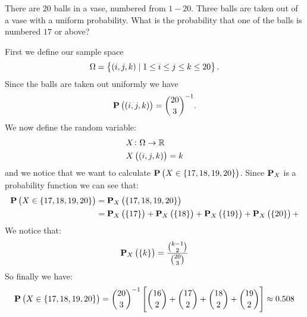 \documentclass[11pt,a4paper]{article}
\begin{document}
  \begin{example}
    There are $20$ balls in a vase, numbered from $1-20$.
    Three balls are taken out of a vase with a uniform probability.
    What is the probability that one of the balls is numbered $17$ or above?

    First we define our sample space
    \[
      \Omega = \set{(i,j,k) \mid 1 \le i \le j \le k \le 20}.
    \]
    Since the balls are taken out uniformly we have 
    \[ \mathbf{P}\left((i,j,k)\right) = {\binom{20}{3}}^{-1}. \]
    We now define the random variable:
    \begin{align*}
      &X \colon \Omega \to \mathbb{R} \\
      &X\left((i,j,k)\right) = k
    \end{align*}
    and we notice that we want to calculate 
    $\mathbf{P}\left(X \in \{17,18,19,20\}\right)$.
    Since $\mathbf{P}_X$ is a probability function we can see that:
    \begin{align*}
      \mathbf{P}\left(X \in \{17,18,19,20\}\right) &= 
      \mathbf{P}_X\left(\{17,18,19,20\}\right) \\ &=
      \mathbf{P}_X\left(\{17\}\right) + 
      \mathbf{P}_X\left(\{18\}\right) +
      \mathbf{P}_X\left(\{19\}\right) +
      \mathbf{P}_X\left(\{20\}\right) +
    \end{align*}
    We notice that:
    \[
      \mathbf{P}_X\left(\{k\}\right) = \frac{\binom{k-1}{2}}{\binom{20}{3}}
    \]
    So finally we have:
    \[
      \mathbf{P}\left(X \in \{17,18,19,20\}\right) = 
      {\binom{20}{3}}^{-1} 
      \left[
        \binom{16}{2} + \binom{17}{2} + \binom{18}{2} + \binom{19}{2}
      \right]
      \approx 0.508
    \]
  \end{example}
\end{document}
